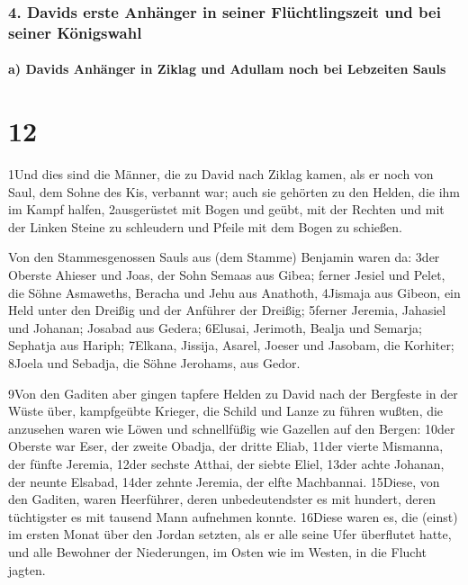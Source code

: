\hypertarget{davids-erste-anhuxe4nger-in-seiner-fluxfcchtlingszeit-und-bei-seiner-kuxf6nigswahl}{%
\subsubsection{4. Davids erste Anhänger in seiner Flüchtlingszeit und
bei seiner
Königswahl}\label{davids-erste-anhuxe4nger-in-seiner-fluxfcchtlingszeit-und-bei-seiner-kuxf6nigswahl}}

\hypertarget{a-davids-anhuxe4nger-in-ziklag-und-adullam-noch-bei-lebzeiten-sauls}{%
\paragraph{a) Davids Anhänger in Ziklag und Adullam noch bei Lebzeiten
Sauls}\label{a-davids-anhuxe4nger-in-ziklag-und-adullam-noch-bei-lebzeiten-sauls}}

\hypertarget{section-11}{%
\section{12}\label{section-11}}

1Und dies sind die Männer, die zu David nach Ziklag kamen, als er noch
von Saul, dem Sohne des Kis, verbannt war; auch sie gehörten zu den
Helden, die ihm im Kampf halfen, 2ausgerüstet mit Bogen und geübt, mit
der Rechten und mit der Linken Steine zu schleudern und Pfeile mit dem
Bogen zu schießen.

Von den Stammesgenossen Sauls aus (dem Stamme) Benjamin waren da: 3der
Oberste Ahieser und Joas, der Sohn Semaas aus Gibea; ferner Jesiel und
Pelet, die Söhne Asmaweths, Beracha und Jehu aus Anathoth, 4Jismaja aus
Gibeon, ein Held unter den Dreißig und der Anführer der Dreißig; 5ferner
Jeremia, Jahasiel und Johanan; Josabad aus Gedera; 6Elusai, Jerimoth,
Bealja und Semarja; Sephatja aus Hariph; 7Elkana, Jissija, Asarel,
Joeser und Jasobam, die Korhiter; 8Joela und Sebadja, die Söhne
Jerohams, aus Gedor.

9Von den Gaditen aber gingen tapfere Helden zu David nach der Bergfeste
in der Wüste über, kampfgeübte Krieger, die Schild und Lanze zu führen
wußten, die anzusehen waren wie Löwen und schnellfüßig wie Gazellen auf
den Bergen: 10der Oberste war Eser, der zweite Obadja, der dritte Eliab,
11der vierte Mismanna, der fünfte Jeremia, 12der sechste Atthai, der
siebte Eliel, 13der achte Johanan, der neunte Elsabad, 14der zehnte
Jeremia, der elfte Machbannai. 15Diese, von den Gaditen, waren
Heerführer, deren unbedeutendster es mit hundert, deren tüchtigster es
mit tausend Mann aufnehmen konnte. 16Diese waren es, die (einst) im
ersten Monat über den Jordan setzten, als er alle seine Ufer überflutet
hatte, und alle Bewohner der Niederungen, im Osten wie im Westen, in die
Flucht jagten.

